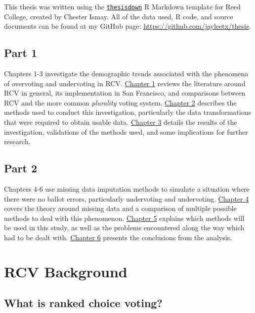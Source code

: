 \documentclass[12pt,twoside]{reedthesis}
\begin{document}
This thesis was written using the \href{https://github.com/ismayc/thesisdown}{\texttt{thesisdown}} R Markdown template for Reed College, created by Chester Ismay. All of the data used, R code, and source documents can be found at my GitHub page: \url{https://github.com/jayleetx/thesis}.

\hypertarget{part-1}{%
\section*{Part 1}\label{part-1}}

Chapters 1-3 investigate the demographic trends associated with the phenomena of overvoting and undervoting in RCV.
\protect\hyperlink{demo-litreview}{Chapter 1} reviews the literature around RCV in general, its implementation in San Francisco, and comparisons between RCV and the more common \emph{plurality} voting system.
\protect\hyperlink{demo-methods}{Chapter 2} describes the methods used to conduct this investigation, particularly the data transformations that were required to obtain usable data.
\protect\hyperlink{demo-results}{Chapter 3} details the results of the investigation, validations of the methods used, and some implications for further research.

\hypertarget{part-2}{%
\section*{Part 2}\label{part-2}}

Chapters 4-6 use missing data imputation methods to simulate a situation where there were no ballot errors, particularly undervoting and undervoting.
\protect\hyperlink{missing-litreview}{Chapter 4} covers the theory around missing data and a comparison of multiple possible methods to deal with this phenomenon.
\protect\hyperlink{missing-methods}{Chapter 5} explains which methods will be used in this study, as well as the problems encountered along the way which had to be dealt with.
\protect\hyperlink{missing-results}{Chapter 6} presents the conclusions from the analysis.

\hypertarget{demo-litreview}{%
\chapter{RCV Background}\label{demo-litreview}}

\hypertarget{what-is-ranked-choice-voting}{%
\section{What is ranked choice voting?}\label{what-is-ranked-choice-voting}}
\end{document}
